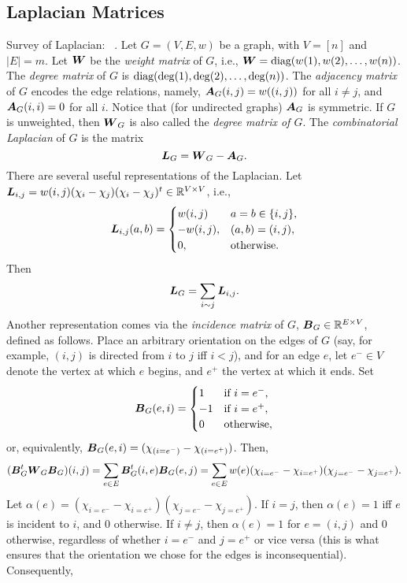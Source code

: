\subsection{Laplacian Matrices}
Survey of Laplacian: ~\cite{merris1994laplacian}.  
Let $G=(V,E,w)$ be a graph, with $V=[n]$ and $|E|=m$. 
Let $\vb*{W}$ be the \emph{weight matrix} of $G$, i.e., $\vb*{W}=\text{diag}(w(1),w(2),\dots,w(n))$. 
The \emph{degree matrix} of $G$ is $\text{diag}(\deg(1),\deg(2),\dots,\deg(n))$. The \emph{adjacency matrix} of $G$ encodes the edge relations, namely, $\vb*{A}_G(i,j)=w((i,j))$ for all $i\neq j$, and $\vb*{A}_G(i,i)=0$ for all $i$. Notice that (for undirected graphs) $\vb*{A}_G$ is symmetric.  If $G$ is unweighted, then $\vb*{W}_G$ is also called the \emph{degree matrix of $G$}. 
The \emph{combinatorial Laplacian} of $G$ is the matrix 
\[\vb*{L}_G=\vb*{W}_G-\vb*{A}_G.\]
There are several useful representations of the Laplacian. Let $\vb*{L}_{i,j}=w(i,j)(\chi_i-\chi_j) (\chi_i-\chi_j)^t\in \mathbb{R}^{V\times V}$, i.e., 
\[\vb*{L}_{i,j}(a,b)=\begin{cases}
w(i,j)&a=b\in\{i,j\},\\
-w(i,j),&(a,b)=(i,j),\\
0,&\text{otherwise}.
\end{cases}\]
Then 
\begin{equation}
\label{eq:Lsum}
    \vb*{L}_G=\sum_{i\sim j}\vb*{L}_{i,j}.
\end{equation}
Another representation comes via the \emph{incidence matrix} of $G$, $\vb*{B}_G\in \mathbb{R}^{E\times V}$, defined as follows. Place an arbitrary orientation on the edges of $G$ (say, for example, $(i,j)$ is directed from $i$ to $j$ iff $i<j$), and for an edge $e$, let $e^-\in V$ denote the vertex at which $e$ begins, and $e^+$ the vertex at which it ends. Set 
\[\vb*{B}_G(e,i)=\begin{cases}
1&\text{if }i=e^-,\\
-1&\text{if }i=e^+,\\
0&\text{otherwise},
\end{cases}\]
or, equivalently, $\vb*{B}_G(e,i) = (\chi_{(i=e^-)}-\chi_{(i=e^+)})$. Then,
\begin{equation*}
   ( \vb*{B}_G^t\vb*{W}_G\vb*{B}_G)(i,j)=\sum_{e\in E} \vb*{B}_G^t(i,e)\vb*{B}_G(e,j)=\sum_{e\in E}w(e)(\chi_{i=e^-}-\chi_{i=e^+})(\chi_{j=e^-}-\chi_{j=e^+}).
\end{equation*}
Let $\alpha(e)=(\chi_{i=e^-}-\chi_{i=e^+})(\chi_{j=e^-}-\chi_{j=e^+})$. If $i=j$, then $\alpha(e)=1$ iff $e$ is incident to $i$, and 0 otherwise. If $i\neq j$, then $\alpha(e)=1$ for $e=(i,j)$ and 0 otherwise, regardless of whether $i=e^-$ and $j=e^+$ or vice versa (this is what ensures that the orientation we chose for the edges is inconsequential). Consequently, 
